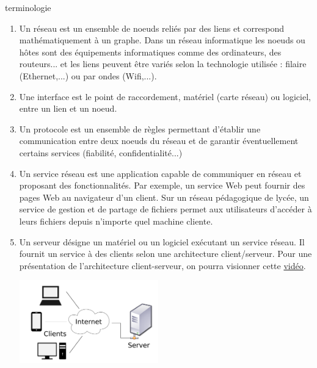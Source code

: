 \documentclass[a4paper,dvipsnames]{article}
\begin{document}
\begin{definition}[breakable]{terminologie}{}
 \begin{enumerate}
   \item Un {\color{red}réseau} est un ensemble de noeuds reliés par des liens et correspond mathématiquement à un graphe. Dans un {\color{red}réseau informatique} les noeuds ou hôtes sont des équipements informatiques comme des ordinateurs, des routeurs... et les liens peuvent être variés selon la technologie utilisée : filaire (Ethernet,...) ou par ondes (Wifi,...).
   \item Une {\color{red}interface} est le point de raccordement, matériel (carte réseau) ou logiciel, entre un lien et un noeud.
   \item Un {\color{red}protocole} est un ensemble de règles permettant d'établir une communication entre deux noeuds du réseau et de garantir éventuellement certains services (fiabilité, confidentialité...)
   \item Un {\color{red}service réseau} est une application capable de communiquer en réseau et proposant des fonctionnalités. Par exemple, un service Web peut fournir des pages Web au navigateur d'un client. Sur un réseau pédagogique de lycée, un service de gestion et de partage de fichiers permet aux utilisateurs d'accéder à leurs fichiers depuis n'importe quel machine cliente.
   \item Un {\color{red}serveur} désigne un matériel ou un logiciel exécutant un {\color{red}service réseau}. Il fournit un service à des {\color{red}clients} selon une {\color{red}architecture client/serveur}. Pour une présentation de l'architecture client-serveur, on pourra visionner cette \href{https://vimeo.com/138623558}{vidéo}.

     \begin{center}
       \includegraphics[width=6cm]{img/architecture_client-serveur.png}
     \end{center}
 \end{enumerate} 
\end{definition}

\medskip
\end{document}
